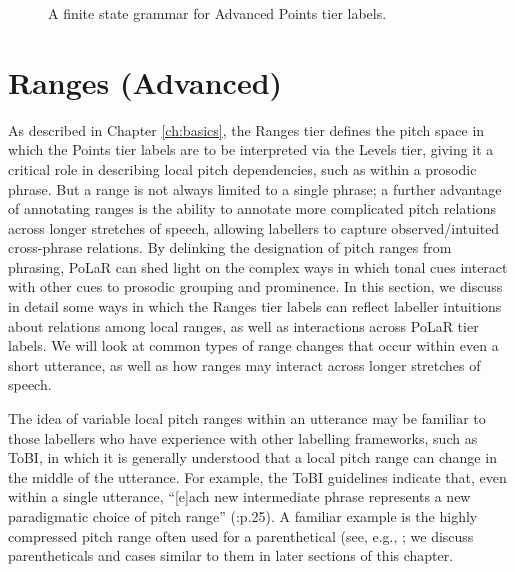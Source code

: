\documentclass[11pt, twoside]{memoir}
\begin{document}
\begin{figure}[H]
%
\caption{A finite state grammar for Advanced Points tier labels.%
\label{fig:Points FSG complete}%
}
\end{figure}


\section{Ranges (Advanced)}\label{sec:ranges-advanced}

As described in Chapter \ref{ch:basics}, the Ranges tier defines the pitch space in which the Points tier labels are to be interpreted via the Levels tier, giving it a critical role in describing local pitch dependencies, such as within a prosodic phrase. But a range is not always limited to a single phrase; a further advantage of annotating ranges is the ability to annotate more complicated pitch relations across longer stretches of speech, allowing labellers to capture observed\slash intuited cross-phrase relations. By delinking the designation of pitch ranges from phrasing, PoLaR can shed light on the complex ways in which tonal cues interact with other cues to prosodic grouping and prominence. In this section, we discuss in detail some ways in which the Ranges tier labels can reflect labeller intuitions about relations among local ranges, as well as interactions across PoLaR tier labels. We will look at common types of range changes that occur within even a short utterance, as well as how ranges may interact across longer stretches of speech.

The idea of variable local pitch ranges within an utterance may be familiar to those labellers who have experience with other labelling frameworks, such as ToBI, in which it is generally understood that a local pitch range can change in the middle of the utterance. For example, the ToBI guidelines indicate that, even within a single utterance, “[e]ach new intermediate phrase represents a new paradigmatic choice of pitch range” (\citealt{beckmanayers97}:p.25). A familiar example is the highly compressed pitch range often used for a parenthetical (see, e.g., \citealt{dehewichmann10}; we discuss parentheticals and cases similar to them in later sections of this chapter.
\end{document}
